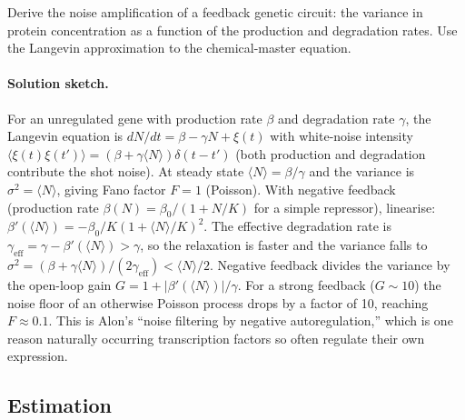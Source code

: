 \begin{exercise}
Derive the noise amplification of a feedback genetic circuit: the
variance in protein concentration as a function of the production
and degradation rates. Use the Langevin approximation to the
chemical-master equation.

\paragraph{Solution sketch.}
For an unregulated gene with production rate $\beta$ and degradation
rate $\gamma$, the Langevin equation is
$dN/dt = \beta - \gamma N + \xi(t)$ with white-noise intensity
$\langle \xi(t) \xi(t') \rangle = (\beta + \gamma \langle N \rangle) \delta(t-t')$
(both production and degradation contribute the shot noise). At
steady state $\langle N \rangle = \beta/\gamma$ and the variance is
$\sigma^{2} = \langle N \rangle$, giving Fano factor $F = 1$
(Poisson). With negative feedback (production rate
$\beta(N) = \beta_{0}/(1 + N/K)$ for a simple repressor), linearise:
$\beta'(\langle N\rangle) = -\beta_{0}/K(1+\langle N\rangle/K)^{2}$.
The effective degradation rate is $\gamma_{\text{eff}} = \gamma - \beta'(\langle N\rangle) > \gamma$,
so the relaxation is faster and the variance falls to
$\sigma^{2} = (\beta + \gamma \langle N \rangle)/(2\gamma_{\text{eff}}) <
\langle N \rangle / 2$. Negative feedback divides the variance by
the open-loop gain $G = 1 + |\beta'(\langle N\rangle)| / \gamma$.
For a strong feedback ($G \sim 10$) the noise floor of an
otherwise Poisson process drops by a factor of 10, reaching
$F \approx 0.1$. This is Alon's ``noise filtering by negative
autoregulation,'' which is one reason naturally occurring
transcription factors so often regulate their own expression.
\end{exercise}

\subsection*{Estimation}

